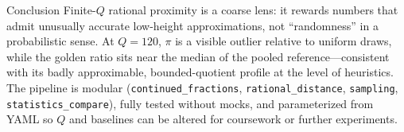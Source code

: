 \documentclass[
  ignorenonframetext,
]{beamer}
\author{\texorpdfstring{}{}}
\date{}
\begin{document}
\begin{frame}[fragile]{Conclusion}
\protect{}\label{conclusion}
Finite-\(Q\) rational proximity is a coarse lens: it rewards numbers
that admit unusually accurate low-height approximations, not
``randomness'' in a probabilistic sense. At \(Q=120\), \(\pi\) is a
visible outlier relative to uniform draws, while the golden ratio sits
near the median of the pooled reference---consistent with its badly
approximable, bounded-quotient profile at the level of heuristics. The
pipeline is modular (\texttt{continued\_fractions},
\texttt{rational\_distance}, \texttt{sampling},
\texttt{statistics\_compare}), fully tested without mocks, and
parameterized from YAML so \(Q\) and baselines can be altered for
coursework or further experiments.
\end{frame}
\end{document}
